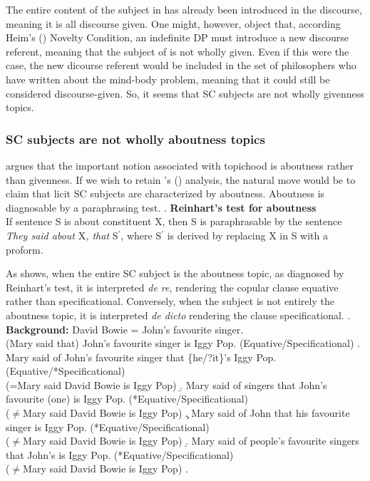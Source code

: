 \documentclass[letterpaper]{article}
\begin{document}
The entire content of the subject in \Last[a] has already been introduced in the discourse, meaning it is all discourse given.
One might, however, object that, according Heim's (\citeyear{heim1982semantics}) Novelty Condition, an indefinite DP must introduce a new discourse referent, meaning that the subject of \Last[a] is not wholly given.
Even if this were the case, the new dicourse referent would be included in the set of philosophers who have written about the mind-body problem, meaning that it could still be considered discourse-given.
So, it seems that SC subjects are not wholly givenness topics.
\subsubsection{SC subjects are not wholly aboutness topics}
\textcite{reinhart1981pragmatics} argues that the important notion associated with topichood is aboutness rather than givenness.
If we wish to retain \citeauthor{mikkelsen2005copular}'s (\citeyear{mikkelsen2005copular}) analysis, the natural move would be to claim that licit SC subjects are characterized by aboutness.
Aboutness is diagnosable by a paraphrasing test.
\ex. \textbf{Reinhart's test for aboutness}\\
If sentence S is about constituent X, then S is paraphrasable by the sentence \textit{They said about }X\textit{, that }S$^\prime$, where S$^\prime$ is derived by replacing X in S with a proform.

As \Next shows, when the entire SC subject is the aboutness topic, as diagnosed by Reinhart's test, it is interpreted \textit{de re}, rendering the copular clause equative rather than specificational.
Conversely, when the subject is not entirely the aboutness topic, it is interpreted \textit{de dicto} rendering the clause specificational.
\ex. \textbf{Background:} David Bowie = John's favourite singer.\\
(Mary said that) John's favourite singer is Iggy Pop. (Equative/Specificational)
\a. Mary said of John's favourite singer that \{he/?it\}'s Iggy Pop.(Equative/*Specificational)\\
(=Mary said David Bowie is Iggy Pop)
\b. Mary said of singers that John's favourite (one) is Iggy Pop. (*Equative/Specificational)\\
($\neq$Mary said David Bowie is Iggy Pop)
\c. Mary said of John that his favourite singer is Iggy Pop. (*Equative/Specificational)\\
($\neq$Mary said David Bowie is Iggy Pop)
\d. Mary said of people's favourite singers that John's is Iggy Pop. (*Equative/Specificational)\\
($\neq$Mary said David Bowie is Iggy Pop)
\z.
\end{document}
